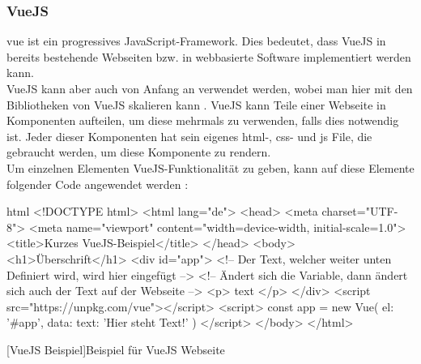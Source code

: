 \subsubsection{VueJS}
\gls{vue} ist ein progressives JavaScript-Framework. Dies bedeutet, dass VueJS in bereits bestehende Webseiten bzw. in webbasierte Software implementiert werden kann.\\
VueJS kann aber auch von Anfang an verwendet werden, wobei man hier mit den Bibliotheken von VueJS skalieren kann \cite{vuedoc}. VueJS kann Teile einer Webseite in Komponenten aufteilen, um diese mehrmals zu verwenden, falls dies notwendig ist. Jeder dieser Komponenten hat sein eigenes \Gls{html}-, \Gls{css}- und \Gls{js} File, die gebraucht werden, um diese Komponente zu rendern.\\
Um einzelnen Elementen VueJS-Funktionalität zu geben, kann auf diese Elemente folgender Code angewendet werden \cite{vuedoc}:
\begin{code}{html}
	<!DOCTYPE html>
	<html lang="de">
		<head>
			<meta charset="UTF-8">
			<meta name="viewport" content="width=device-width, initial-scale=1.0">
			<title>Kurzes VueJS-Beispiel</title>
		</head>
		<body>
			<h1>Überschrift</h1>
			<div id="app">
				<!-- Der Text, welcher weiter unten Definiert wird, wird hier eingefügt -->
				<!-- Ändert sich die Variable, dann ändert sich auch der Text auf der Webseite -->
				<p> {{ text }} </p>
			</div>
			<script src="https://unpkg.com/vue"></script>
			<script>
				const app = new Vue({
					el: '#app',
					data: {
						text: 'Hier steht Text!'
					}
				})
			</script>
		</body>
	</html>
\end{code}
[VueJS Beispiel]{Beispiel für VueJS Webseite}~\\
